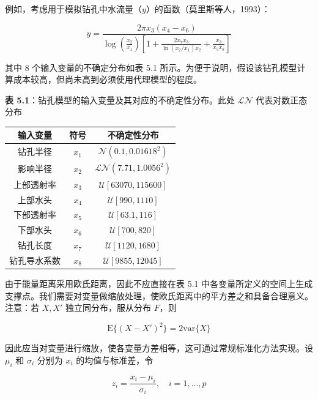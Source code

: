\documentclass{ctexart}
\begin{document}
例如，考虑用于模拟钻孔中水流量（$y$）的函数（莫里斯等人，1993）：

\begin{equation*}
y=\frac{2\pi x_3(x_4-x_6)}{\log\left(\frac{x_2}{x_1}\right)\left[1+\frac{2x_7x_3}{\ln(x_2/x_1)x_2}+\frac{x_3}{x_5x_8}\right]}
\end{equation*}

其中 8 个输入变量的不确定分布如表 5.1 所示。为便于说明，假设该钻孔模型计算成本较高，但尚未高到必须使用代理模型的程度。

\begin{mdquote}
\textbf{表 5.1}：钻孔模型的输入变量及其对应的不确定性分布。此处 $\mathcal{L}\mathcal{N}$ 代表对数正态分布
\end{mdquote}

\begin{table}[htbp]
\begin{tabular}{c|c|c}
\hline
输入变量 & 符号 & 不确定性分布 \\
\hline
钻孔半径 & $x_1$ & $\mathcal{N}(0.1,0.01618^2)$ \\
影响半径 & $x_2$ & $\mathcal{L}\mathcal{N}(7.71,1.0056^2)$ \\
上部透射率 & $x_3$ & $\mathcal{U}[63070,115600]$ \\
上部水头 & $x_4$ & $\mathcal{U}[990,1110]$ \\
下部透射率 & $x_5$ & $\mathcal{U}[63.1,116]$ \\
下部水头 & $x_6$ & $\mathcal{U}[700,820]$ \\
钻孔长度 & $x_7$ & $\mathcal{U}[1120,1680]$ \\
钻孔导水系数 & $x_8$ & $\mathcal{U}[9855,12045]$ \\
\hline
\end{tabular}
\end{table}

由于能量距离采用欧氏距离，因此不应直接在表 5.1 中各变量所定义的空间上生成支撑点。我们需要对变量做缩放处理，使欧氏距离中的平方差之和具备合理意义。注意：若 $X,X'$ 独立同分布，服从分布 $F$，则

\begin{equation*}
\mathrm{E}\{(X-X')^2\}=2\mathrm{var}\{X\}
\end{equation*}

因此应当对变量进行缩放，使各变量方差相等，这可通过常规标准化方法实现。设 $\mu_i$ 和 $\sigma_i$ 分别为 $x_i$ 的均值与标准差，令

\begin{equation*}
z_i=\frac{x_i-\mu_i}{\sigma_i},\quad i=1,\dots,p
\end{equation*}
\end{document}
